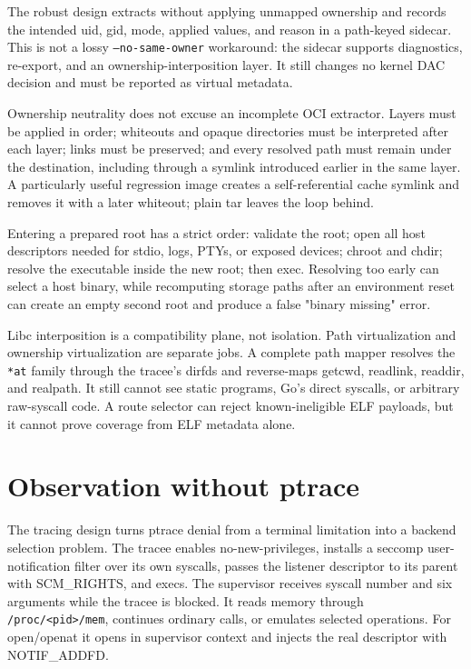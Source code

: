 \documentclass[10pt,twocolumn]{article}
\begin{document}
The robust design extracts without applying unmapped ownership and records the intended uid, gid, mode, applied values, and reason in a path-keyed sidecar. This is not a lossy \texttt{--no-same-owner} workaround: the sidecar supports diagnostics, re-export, and an ownership-interposition layer. It still changes no kernel DAC decision and must be reported as virtual metadata.

Ownership neutrality does not excuse an incomplete OCI extractor. Layers must be applied in order; whiteouts and opaque directories must be interpreted after each layer; links must be preserved; and every resolved path must remain under the destination, including through a symlink introduced earlier in the same layer. A particularly useful regression image creates a self-referential cache symlink and removes it with a later whiteout; plain tar leaves the loop behind.

Entering a prepared root has a strict order: validate the root; open all host descriptors needed for stdio, logs, PTYs, or exposed devices; chroot and chdir; resolve the executable inside the new root; then exec. Resolving too early can select a host binary, while recomputing storage paths after an environment reset can create an empty second root and produce a false "binary missing" error.

Libc interposition is a compatibility plane, not isolation. Path virtualization and ownership virtualization are separate jobs. A complete path mapper resolves the \texttt{*at} family through the tracee's dirfds and reverse-maps getcwd, readlink, readdir, and realpath. It still cannot see static programs, Go's direct syscalls, or arbitrary raw-syscall code. A route selector can reject known-ineligible ELF payloads, but it cannot prove coverage from ELF metadata alone.

\section{Observation without ptrace}
The tracing design turns ptrace denial from a terminal limitation into a backend selection problem. The tracee enables no-new-privileges, installs a seccomp user- notification filter over its own syscalls, passes the listener descriptor to its parent with SCM\_RIGHTS, and execs. The supervisor receives syscall number and six arguments while the tracee is blocked. It reads memory through \texttt{/proc/<pid>/mem}, continues ordinary calls, or emulates selected operations. For open/openat it opens in supervisor context and injects the real descriptor with NOTIF\_ADDFD.
\end{document}
